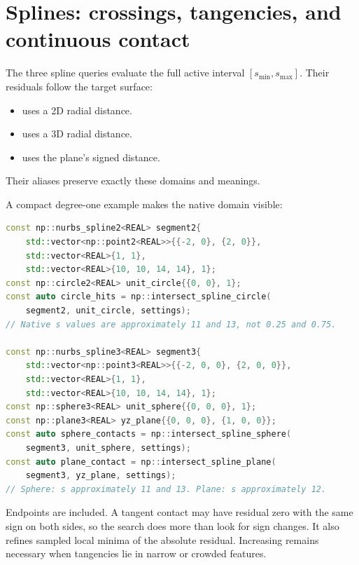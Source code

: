 \section{Splines: crossings, tangencies, and continuous contact}

The three spline queries evaluate the full active interval
$[s_{\min},s_{\max}]$. Their residuals follow the target surface:
\begin{itemize}
\item {} uses a 2D radial distance.
\item {} uses a 3D radial distance.
\item {} uses the plane's signed distance.
\end{itemize}
Their  aliases preserve exactly these domains and meanings.

A compact degree-one example makes the native domain visible:
\par\noindent\begin{minipage}{\linewidth}
\begin{lstlisting}[language=C++]
const np::nurbs_spline2<REAL> segment2{
    std::vector<np::point2<REAL>>{{-2, 0}, {2, 0}},
    std::vector<REAL>{1, 1},
    std::vector<REAL>{10, 10, 14, 14}, 1};
const np::circle2<REAL> unit_circle{{0, 0}, 1};
const auto circle_hits = np::intersect_spline_circle(
    segment2, unit_circle, settings);
// Native s values are approximately 11 and 13, not 0.25 and 0.75.

const np::nurbs_spline3<REAL> segment3{
    std::vector<np::point3<REAL>>{{-2, 0, 0}, {2, 0, 0}},
    std::vector<REAL>{1, 1},
    std::vector<REAL>{10, 10, 14, 14}, 1};
const np::sphere3<REAL> unit_sphere{{0, 0, 0}, 1};
const np::plane3<REAL> yz_plane{{0, 0, 0}, {1, 0, 0}};
const auto sphere_contacts = np::intersect_spline_sphere(
    segment3, unit_sphere, settings);
const auto plane_contact = np::intersect_spline_plane(
    segment3, yz_plane, settings);
// Sphere: s approximately 11 and 13. Plane: s approximately 12.
\end{lstlisting}
\end{minipage}\par
Endpoints are included. A tangent contact may have residual zero with the same
sign on both sides, so the search does more than look for sign changes. It also
refines sampled local minima of the absolute residual. Increasing
 remains necessary when tangencies lie in narrow or crowded
features.

